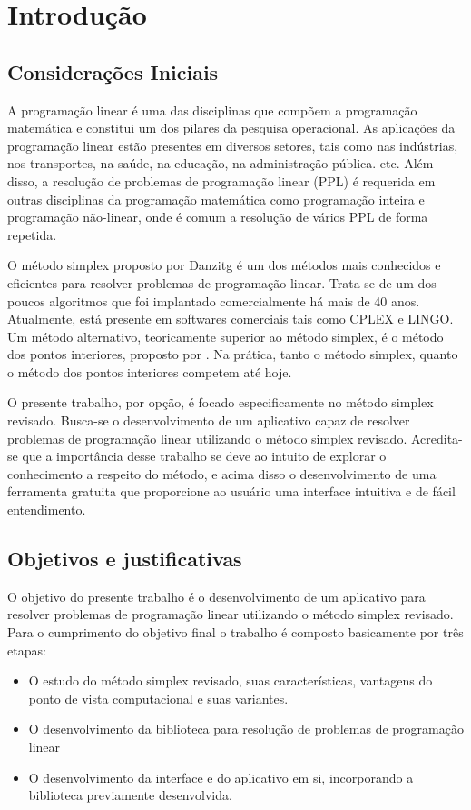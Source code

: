 \chapter{Introdução}

\section{Considerações Iniciais}
A programação linear é uma das disciplinas que compõem a programação matemática e constitui um dos pilares da pesquisa operacional. As aplicações da programação linear estão presentes em diversos setores, tais como nas indústrias, nos transportes, na saúde, na educação, na administração pública. etc.  Além disso, a resolução de problemas de programação linear (PPL) é requerida em outras disciplinas da programação matemática como programação inteira e programação não-linear, onde é comum a resolução de vários PPL de forma repetida.

O método simplex proposto por Danzitg é um dos métodos mais conhecidos e eficientes para resolver problemas de programação linear. Trata-se de um dos poucos algoritmos que foi implantado comercialmente há mais de 40 anos. Atualmente, está presente em softwares comerciais tais como CPLEX e LINGO. Um método alternativo, teoricamente superior ao método simplex, é o método dos pontos interiores, proposto por . Na prática, tanto o método simplex, quanto o método dos pontos interiores competem até hoje.  

O presente trabalho, por opção, é focado especificamente no método simplex revisado. Busca-se o desenvolvimento de um aplicativo capaz de resolver problemas de programação linear utilizando o método simplex revisado. Acredita-se que a importância desse trabalho se deve ao intuito de explorar o conhecimento a respeito do método, e acima disso o desenvolvimento de uma ferramenta gratuita que proporcione ao usuário uma interface intuitiva e de fácil entendimento.

\section{Objetivos e justificativas}
O objetivo do presente trabalho é o desenvolvimento de um aplicativo para resolver problemas de programação linear utilizando o método simplex revisado. Para o cumprimento do objetivo final o trabalho é composto basicamente por três etapas: 

\begin{itemize}
\item O estudo do método simplex revisado, suas características, vantagens do ponto de vista computacional e suas variantes.
\item O desenvolvimento da biblioteca para resolução de problemas de programação linear
\item O desenvolvimento da interface e do aplicativo em si, incorporando a biblioteca previamente desenvolvida.
\end{itemize}

